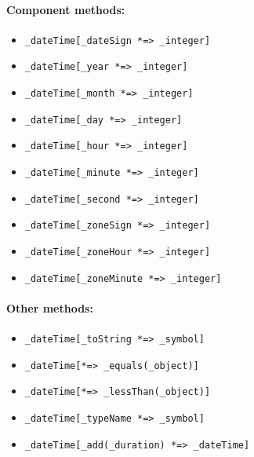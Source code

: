 \documentclass[11pt]{article}
\begin{document}
\paragraph{Component methods:}
\begin{itemize}
      \item {\tt \_dateTime[\_dateSign *=> \_integer]}  
      \item {\tt \_dateTime[\_year *=> \_integer]}  
      \item {\tt \_dateTime[\_month *=> \_integer]}  
      \item {\tt \_dateTime[\_day *=> \_integer]}  
      \item {\tt \_dateTime[\_hour *=> \_integer]}  
      \item {\tt \_dateTime[\_minute *=> \_integer]}  
      \item {\tt \_dateTime[\_second *=> \_integer]}  
      \item {\tt \_dateTime[\_zoneSign *=> \_integer]}  
      \item {\tt \_dateTime[\_zoneHour *=> \_integer]}  
      \item {\tt \_dateTime[\_zoneMinute *=> \_integer]}  
    \end{itemize}

\paragraph{Other methods:}
\begin{itemize}
      \item {\tt \_dateTime[\_toString *=> \_symbol]}  
      \item {\tt \_dateTime[*=> \_equals(\_object)]}  
      \item {\tt \_dateTime[*=> \_lessThan(\_object)]}  
      \item {\tt \_dateTime[\_typeName *=> \_symbol]}  
      \item {\tt \_dateTime[\_add(\_duration) *=> \_dateTime]}  
    \end{itemize}
\end{document}
